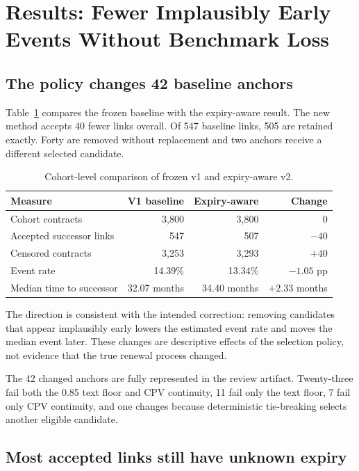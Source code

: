 \documentclass[11pt,a4paper]{article}
\begin{document}
\section{Results: Fewer Implausibly Early Events Without Benchmark Loss}

\subsection{The policy changes 42 baseline anchors}

Table~\ref{tab:overall} compares the frozen baseline with the expiry-aware result.
The new method accepts 40 fewer links overall. Of 547 baseline links, 505 are
retained exactly. Forty are removed without replacement and two anchors receive a
different selected candidate.

\begin{table}[H]
\centering
\caption{Cohort-level comparison of frozen v1 and expiry-aware v2.}
\label{tab:overall}
\begin{tabular}{lrrr}
\toprule
\textbf{Measure} & \textbf{V1 baseline} & \textbf{Expiry-aware} & \textbf{Change} \\
\midrule
Cohort contracts & 3,800 & 3,800 & 0 \\
Accepted successor links & 547 & 507 & $-40$ \\
Censored contracts & 3,253 & 3,293 & $+40$ \\
Event rate & 14.39\% & 13.34\% & $-1.05$ pp \\
Median time to successor & 32.07 months & 34.40 months & $+2.33$ months \\
\bottomrule
\end{tabular}
\end{table}

The direction is consistent with the intended correction: removing candidates that
appear implausibly early lowers the estimated event rate and moves the median event
later. These changes are descriptive effects of the selection policy, not evidence
that the true renewal process changed.

The 42 changed anchors are fully represented in the review artifact. Twenty-three
fail both the 0.85 text floor and CPV continuity, 11 fail only the text floor, 7 fail
only CPV continuity, and one changes because deterministic tie-breaking selects
another eligible candidate.

\subsection{Most accepted links still have unknown expiry}
\end{document}
